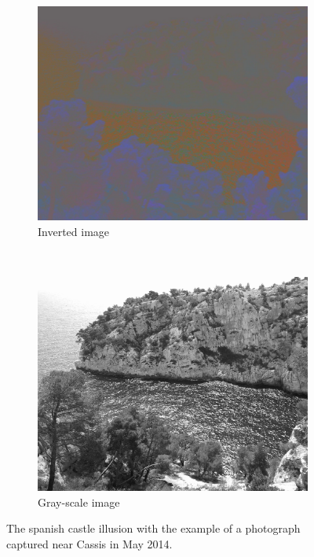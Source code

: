 \documentclass[a4paper]{article}
\begin{document}
\begin{figure}[H]
	\vspace{3mm}
	\begin{subfigure}[h]{0.48\textwidth}
		\centering
		\includegraphics[width=\textwidth]{calanque_inv}
		\caption*{Inverted image}
	\end{subfigure}
	~
	\begin{subfigure}[h]{0.48\textwidth}
		\centering
		\includegraphics[width=\textwidth]{calanque_gray}
		\caption*{Gray-scale image}
	\end{subfigure}	
\caption{The spanish castle illusion with the example of a photograph captured near Cassis in May 2014.}
\label{fig:road}
\end{figure}
\end{document}
